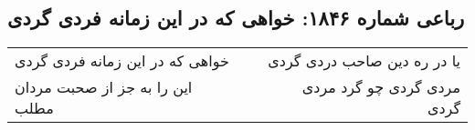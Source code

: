 \begin{center}
\section*{رباعی شماره ۱۸۴۶: خواهی که در این زمانه فردی گردی}
\label{sec:1846}
\begin{longtable}{l p{0.5cm} r}
خواهی که در این زمانه فردی گردی
&&
یا در ره دین صاحب دردی گردی
\\
این را به جز از صحبت مردان مطلب
&&
مردی گردی چو گرد مردی گردی
\\
\end{longtable}
\end{center}
